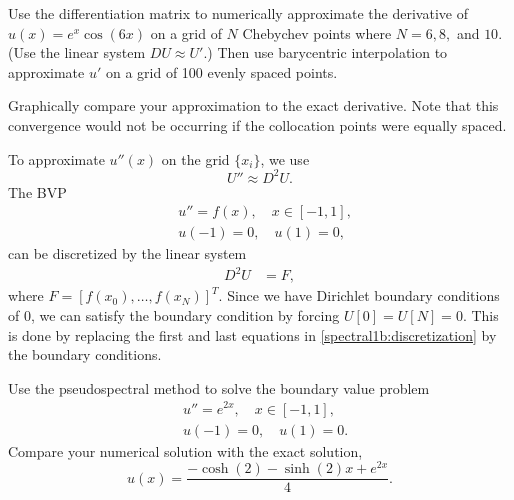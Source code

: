 \begin{problem}
Use the differentiation matrix to numerically approximate the derivative of $u(x) = e^{x}\cos(6x)$ on a grid of $N$ Chebychev points where $N=6, 8,$ and $10.$  
(Use the linear system $D U \approx U'$.)
Then use barycentric interpolation to approximate $u'$ on a grid of 100 evenly spaced points.

Graphically compare your approximation to the exact derivative. 
Note that this convergence would not be occurring if the collocation points were equally spaced. 
\end{problem}

To approximate $u''(x)$ on the grid $\{x_i\}$, we use 
\[U'' \approx D^2 U.\]
The BVP
\begin{align*}
&{ }u'' = f(x), \quad x \in [-1,1],\\
&{ }u(-1) = 0, \quad u(1) = 0,
\end{align*}
can be discretized by the linear system 
\begin{align}
	D^2 U &= F, \label{spectral1b:discretization}
\end{align}
where $F = [f(x_0),\ldots, f(x_N)]^T$.
Since we have Dirichlet boundary conditions of $0$, we can satisfy the boundary condition by forcing $U[0] = U[N] = 0$. 
This is done by replacing the first and last equations in \eqref{spectral1b:discretization} by the boundary conditions. 


\begin{problem}
Use the pseudospectral method to solve the boundary value problem 
\begin{align*}
&{ } u'' = e^{2x}, \quad x \in [-1,1], \\
&{ } u(-1) = 0, \quad u(1) = 0.
\end{align*}
Compare your numerical solution with the exact solution, 
\[
u(x) = \frac{- \cosh(2) - \sinh(2)x + e^{2x}}{4}.
\]
\end{problem}


